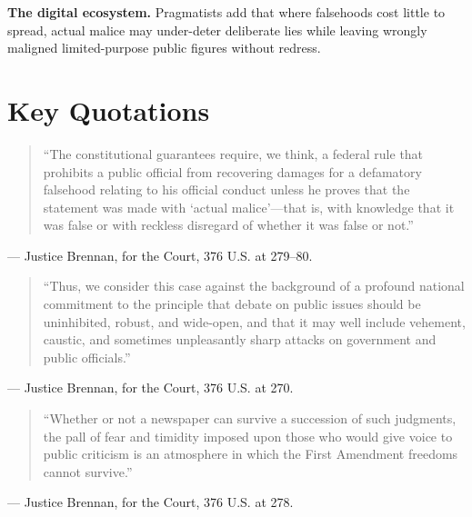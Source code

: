 \documentclass[12pt]{article}
\begin{document}
\textbf{The digital ecosystem.} Pragmatists add that where falsehoods cost little to spread, actual malice may under-deter deliberate lies while leaving wrongly maligned limited-purpose public figures without redress.

\section{Key Quotations}

\begin{quote}
``The constitutional guarantees require, we think, a federal rule that prohibits a public official from recovering damages for a defamatory falsehood relating to his official conduct unless he proves that the statement was made with `actual malice'---that is, with knowledge that it was false or with reckless disregard of whether it was false or not.''
\end{quote}
\noindent --- Justice Brennan, for the Court, 376 U.S. at 279--80.

\begin{quote}
``Thus, we consider this case against the background of a profound national commitment to the principle that debate on public issues should be uninhibited, robust, and wide-open, and that it may well include vehement, caustic, and sometimes unpleasantly sharp attacks on government and public officials.''
\end{quote}
\noindent --- Justice Brennan, for the Court, 376 U.S. at 270.

\begin{quote}
``Whether or not a newspaper can survive a succession of such judgments, the pall of fear and timidity imposed upon those who would give voice to public criticism is an atmosphere in which the First Amendment freedoms cannot survive.''
\end{quote}
\noindent --- Justice Brennan, for the Court, 376 U.S. at 278.
\end{document}

